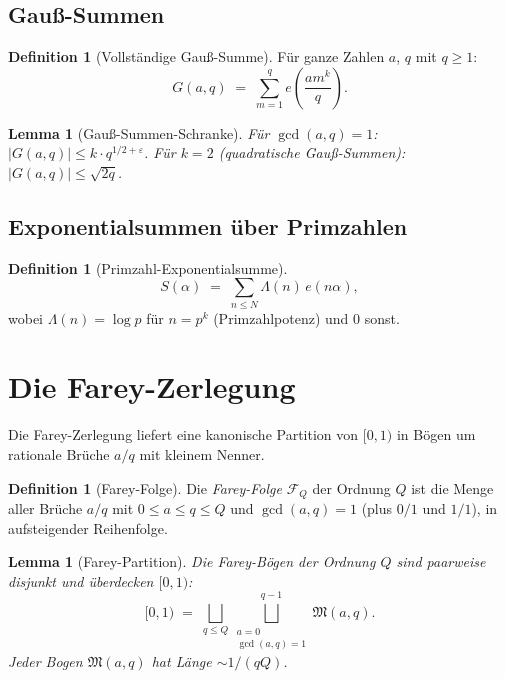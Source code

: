 \documentclass[12pt,a4paper]{amsart}
\newtheorem{lemma}[theorem]{Lemma}
\theoremstyle{definition}
\newtheorem{definition}[theorem]{Definition}
\newcommand{\eq}[1]{e\!\left(#1\right)}
\begin{document}
\subsection{Gauß-Summen}

\begin{definition}[Vollständige Gauß-Summe]
  Für ganze Zahlen $a$, $q$ mit $q \geq 1$:
  \[
    G(a, q) \;=\; \sum_{m=1}^{q} \eq{\frac{a m^k}{q}}.
  \]
\end{definition}

\begin{lemma}[Gauß-Summen-Schranke]\label{lem:gauss}
  Für $\gcd(a, q) = 1$: $|G(a, q)| \leq k \cdot q^{1/2 + \varepsilon}$.
  Für $k = 2$ (quadratische Gauß-Summen): $|G(a,q)| \leq \sqrt{2q}$.
\end{lemma}

\subsection{Exponentialsummen über Primzahlen}

\begin{definition}[Primzahl-Exponentialsumme]
  \[
    S(\alpha) \;=\; \sum_{n \leq N} \Lambda(n)\, \eq{n\alpha},
  \]
  wobei $\Lambda(n) = \log p$ für $n = p^k$ (Primzahlpotenz) und $0$ sonst.
\end{definition}

\section{Die Farey-Zerlegung}
\label{sec:farey}

Die Farey-Zerlegung liefert eine kanonische Partition von $[0,1)$ in
Bögen um rationale Brüche $a/q$ mit kleinem Nenner.

\begin{definition}[Farey-Folge]
  Die \emph{Farey-Folge} $\mathcal{F}_Q$ der Ordnung $Q$ ist die Menge
  aller Brüche $a/q$ mit $0 \leq a \leq q \leq Q$ und $\gcd(a,q) = 1$
  (plus $0/1$ und $1/1$), in aufsteigender Reihenfolge.
\end{definition}

\begin{lemma}[Farey-Partition]\label{lem:farey}
  Die Farey-Bögen der Ordnung $Q$ sind paarweise disjunkt und überdecken
  $[0,1)$:
  \[
    [0, 1) \;=\; \bigsqcup_{q \leq Q} \bigsqcup_{\substack{a=0\\ \gcd(a,q)=1}}^{q-1}
                 \mathfrak{M}(a, q).
  \]
  Jeder Bogen $\mathfrak{M}(a, q)$ hat Länge $\sim 1/(qQ)$.
\end{lemma}
\end{document}
